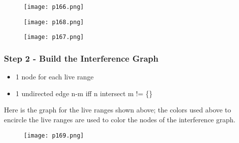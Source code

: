 \begin{figure}[H]
	\centering
	\texttt{[image: p166.png]}
	\caption{}
	\label{fig:p166}
\end{figure}

\begin{figure}[H]
	\centering
	\texttt{[image: p168.png]}
	\caption{}
	\label{fig:p168}
\end{figure}
\begin{figure}[H]
	\centering
	\texttt{[image: p167.png]}
	\caption{}
	\label{fig:p167}
\end{figure}


\subsubsection{Step 2 - Build the Interference Graph}

\begin{itemize}
	\item 1 node for each live range
	\item 1 undirected edge n-m iff n intersect m != \{\}
\end{itemize}


Here is the graph for the live ranges shown above; the colors used above to encircle the live ranges are used to color the nodes of the interference graph.
\begin{figure}[H]
	\centering
	\texttt{[image: p169.png]}
	\caption{}
	\label{fig:p169}
\end{figure}



